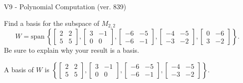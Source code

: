 \begin{exercise}
  \begin{exerciseTitle}V9 - Polynomial Computation (ver. 839)\end{exerciseTitle}
  \begin{exerciseStatement}
    Find a basis for the subspace of \(M_{2,2}\) 
\[W=\mathrm{span}\ \left\{\left[\begin{array}{cc}
2 & 2 \\
5 & 5
\end{array}\right] , \left[\begin{array}{cc}
3 & -1 \\
0 & 0
\end{array}\right] , \left[\begin{array}{cc}
-6 & -5 \\
-6 & -1
\end{array}\right] , \left[\begin{array}{cc}
-4 & -5 \\
-3 & -2
\end{array}\right] , \left[\begin{array}{cc}
0 & -6 \\
3 & -2
\end{array}\right]\right\}.\]
 Be sure to explain why your result is a basis.


  \end{exerciseStatement}
  \begin{exerciseAnswer}
   A basis of \(W\) is  \(\left\{\left[\begin{array}{cc}
2 & 2 \\
5 & 5
\end{array}\right] , \left[\begin{array}{cc}
3 & -1 \\
0 & 0
\end{array}\right] , \left[\begin{array}{cc}
-6 & -5 \\
-6 & -1
\end{array}\right] , \left[\begin{array}{cc}
-4 & -5 \\
-3 & -2
\end{array}\right]\right\}\).
  


  \end{exerciseAnswer}
\end{exercise}